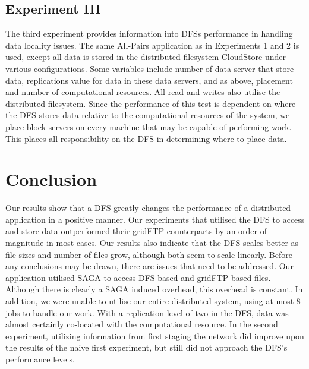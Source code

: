 \documentclass{rspublic}
\begin{document}
\subsection{Experiment III} The third experiment provides information
into DFSs performance in handling data locality issues.  The same
All-Pairs application as in Experiments 1 and 2 is used, except all data
is stored in the distributed filesystem CloudStore under various
configurations.  Some variables include number of data server that store
data, replications value for data in these data servers, and as above,
placement and number of computational resources.  All read and writes
also utilise the distributed filesystem.  Since the performance of this
test is dependent on where the DFS stores data relative to the
computational resources of the system, we place block-servers on every
machine that may be capable of performing work.  This places all
responsibility on the DFS in determining where to place data.

\section{Conclusion} Our results show that a DFS greatly changes the
performance of a distributed application in a positive manner.  Our
experiments that utilised the DFS to access and store data outperformed
their gridFTP counterparts by an order of magnitude in most cases. Our
results also indicate that the DFS scales better as file sizes and
number of files grow, although both seem to scale linearly.  Before any
conclusions may be drawn, there are issues that need to be addressed.
Our application utilised SAGA to access DFS based and gridFTP based
files.  Although there is clearly a SAGA induced overhead, this overhead
is constant.   In addition, we were unable to utilise our
entire distributed system, using at most 8 jobs to handle our work.
With a replication level of two in the DFS, data was almost certainly
co-located with the computational resource.  In the second experiment,
utilizing information from first staging the network did improve upon
the results of the naive first experiment, but still did not approach
the DFS's performance levels.
\end{document}
